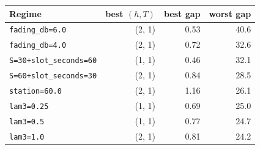 \begin{tabular}{lrrr}
\toprule
Regime & best $(h,T)$ & best gap & worst gap \\
\midrule
\texttt{fading\_db=6.0} & (2, 1) & 0.53 & 40.6 \\
\texttt{fading\_db=4.0} & (2, 1) & 0.72 & 32.6 \\
\texttt{S=30+slot\_seconds=60} & (1, 1) & 0.46 & 32.1 \\
\texttt{S=60+slot\_seconds=30} & (2, 1) & 0.84 & 28.5 \\
\texttt{station=60.0} & (2, 1) & 1.16 & 26.1 \\
\texttt{lam3=0.25} & (1, 1) & 0.69 & 25.0 \\
\texttt{lam3=0.5} & (1, 1) & 0.77 & 24.7 \\
\texttt{lam3=1.0} & (2, 1) & 0.81 & 24.2 \\
\bottomrule
\end{tabular}
